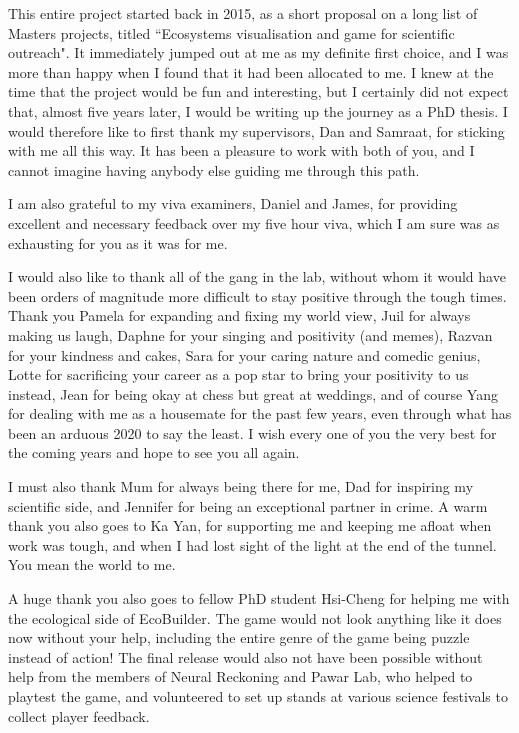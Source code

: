 \cleardoublepage


\begin{acknowledgements}

This entire project started back in 2015, as a short proposal on a long list of Masters projects, titled ``Ecosystems visualisation and game for scientific outreach". It immediately jumped out at me as my definite first choice, and I was more than happy when I found that it had been allocated to me. I knew at the time that the project would be fun and interesting, but I certainly did not expect that, almost five years later, I would be writing up the journey as a PhD thesis.
I would therefore like to first thank my supervisors, Dan and Samraat, for sticking with me all this way. It has been a pleasure to work with both of you, and I cannot imagine having anybody else guiding me through this path.

I am also grateful to my viva examiners, Daniel and James, for providing excellent and necessary feedback over my five hour viva, which I am sure was as exhausting for you as it was for me.

I would also like to thank all of the gang in the lab, without whom it would have been orders of magnitude more difficult to stay positive through the tough times. Thank you Pamela for expanding and fixing my world view, Juil for always making us laugh, Daphne for your singing and positivity (and memes), Razvan for your kindness and cakes, Sara for your caring nature and comedic genius, Lotte for sacrificing your career as a pop star to bring your positivity to us instead, Jean for being okay at chess but great at weddings, and of course Yang for dealing with me as a housemate for the past few years, even through what has been an arduous 2020 to say the least.
I wish every one of you the very best for the coming years and hope to see you all again.

I must also thank Mum for always being there for me, Dad for inspiring my scientific side, and Jennifer for being an exceptional partner in crime. A warm thank you also goes to Ka Yan, for supporting me and keeping me afloat when work was tough, and when I had lost sight of the light at the end of the tunnel. You mean the world to me.

A huge thank you also goes to fellow PhD student Hsi-Cheng for helping me with the ecological side of EcoBuilder. The game would not look anything like it does now without your help, including the entire genre of the game being puzzle instead of action!
The final release would also not have been possible without help from the members of Neural Reckoning and Pawar Lab, who helped to playtest the game, and volunteered to set up stands at various science festivals to collect player feedback.


\end{acknowledgements}
